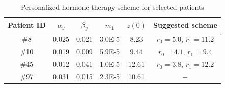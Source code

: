 \begin{table}[h]
\caption{Personalized hormone therapy scheme for selected patients\label{prostate2}}
\centering
\begin{tabular}{c|c|c|c|c|c}
\hline
Patient ID  & $\alpha_y$  & $\beta_y$ & $m_1$ & $z(0)$ & Suggested scheme  \\\hline
\#8 & 0.025 & 0.021  & 3.0E-5 & 8.23 & $r_0=5.0$, $r_1=11.2$ \\
\#10 & 0.019 & 0.009  & 5.9E-5 & 9.44 & $r_0=4.1$, $r_1=9.4$ \\
\#45 & 0.012  & 0.041  & 1.0E-5 & 12.61 & $r_0=3.8$, $r_1=12.2$ \\
\#97 & 0.031  & 0.015  & 2.3E-5 & 10.61 & $-$ \\
\hline
\end{tabular}
\end{table}





